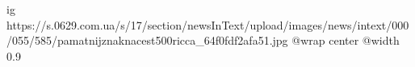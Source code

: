  
 
 
 
 

\ifcmt
  ig https://s.0629.com.ua/s/17/section/newsInText/upload/images/news/intext/000/055/585/pamatnijznaknacest500ricca_64f0fdf2afa51.jpg
  @wrap center
  @width 0.9
\fi
